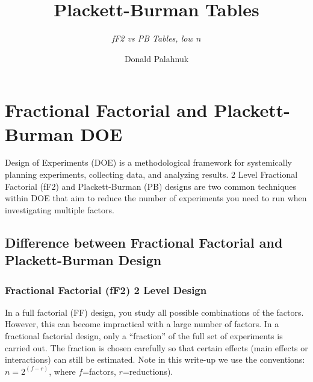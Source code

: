 \documentclass[
  12pt,
  a4paper,
]{article}
\title{Plackett-Burman Tables}
\subtitle{\textit{fF2 vs PB Tables, low $n$}}
\author{Donald Palahnuk}
\date{\vhCurrentDate\\
version \vhCurrentVersion\\
\strut \\
InsightHatch WhitePaper: fF2 vs PB Tables For (low \(n\))\\
\textbf{IH-fF2 PB Tables-v}\textbf{\vhCurrentVersion}}
\numberwithin{equation}{section}
\theoremstyle{plain}
\theoremstyle{definition}
\theoremstyle{remark}
\theoremstyle{note}
\begin{document}
\maketitle

{
\setcounter{tocdepth}{2}
\tableofcontents
}
\hfill\break

\begin{versionhistory}
\end{versionhistory}

\newpage

\hypertarget{fractional-factorial-and-plackett-burman-doe}{%
\section{Fractional Factorial and Plackett-Burman
DOE}\label{fractional-factorial-and-plackett-burman-doe}}

Design of Experiments (DOE) is a methodological framework for
systemically planning experiments, collecting data, and analyzing
results. 2 Level Fractional Factorial (fF2) and Plackett-Burman (PB)
designs are two common techniques within DOE that aim to reduce the
number of experiments you need to run when investigating multiple
factors.

\hypertarget{difference-between-fractional-factorial-and-plackett-burman-design}{%
\subsection{Difference between Fractional Factorial and Plackett-Burman
Design}\label{difference-between-fractional-factorial-and-plackett-burman-design}}

\hypertarget{fractional-factorial-ff2-2-level-design}{%
\subsubsection{Fractional Factorial (fF2) 2 Level
Design}\label{fractional-factorial-ff2-2-level-design}}

In a full factorial (FF) design, you study all possible combinations of
the factors. However, this can become impractical with a large number of
factors. In a fractional factorial design, only a ``fraction'' of the
full set of experiments is carried out. The fraction is chosen carefully
so that certain effects (main effects or interactions) can still be
estimated. Note in this write-up we use the conventions:
\(n = 2^{(f-r)}\), where \(f\)=factors, \(r\)=reductions).
\end{document}

